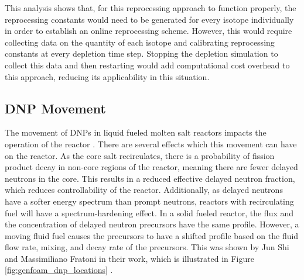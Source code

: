 This analysis shows that, for this reprocessing approach to function properly, the reprocessing constants would need to be generated for every isotope individually in order to establish an online reprocessing scheme. However, this would require collecting data on the quantity of each isotope and calibrating reprocessing constants at every depletion time step. Stopping the depletion simulation to collect this data and then restarting would add computational cost overhead to this approach, reducing its applicability in this situation.



\subsection{DNP Movement}

The movement of DNPs in liquid fueled molten salt reactors impacts the operation of the reactor \cite{wooten_review_2018, aufiero_calculating_2014}. %
There are several effects which this movement can have on the reactor. %
As the core salt recirculates, there is a probability of fission product decay in non-core regions of the reactor, meaning there are fewer delayed neutrons in the core. This results in a reduced effective delayed neutron fraction, which reduces controllability of the reactor. Additionally, as delayed neutrons have a softer energy spectrum than prompt neutrons, reactors with recirculating fuel will have a spectrum-hardening effect.
In a solid fueled reactor, the flux and the concentration of delayed neutron precursors have the same profile. However, a moving fluid fuel causes the precursors to have a shifted profile based on the fluid flow rate, mixing, and decay rate of the precursors. This was shown by Jun Shi and Massimiliano Fratoni in their work, which is illustrated in Figure \ref{fig:genfoam_dnp_locations} \cite{shi_gen-foam_2021}. 

